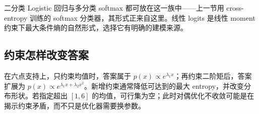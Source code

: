 二分类 Logistic 回归与多分类 softmax 都可放在这一族中——上一节用 cross-entropy 训练的 softmax 分类器，其形式正来自这里。线性 logits 是线性 moment 约束下最大条件熵的自然形式，选择它有明确的建模来源。

\subsection{约束怎样改变答案}

在六点支持上，只约束均值时，答案属于 \(p(x)\propto e^{\lambda_1x}\)；再约束二阶矩后，答案扩展为 \(p(x)\propto e^{\lambda_1x+\lambda_2x^2}\)。新增约束通常降低可达到的最大 entropy，并改变分布形状。若指定超出 \([1,6]\) 的均值，可行集为空；此时对偶优化不收敛可能是在揭示约束矛盾，而不只是优化器需要换参数。
